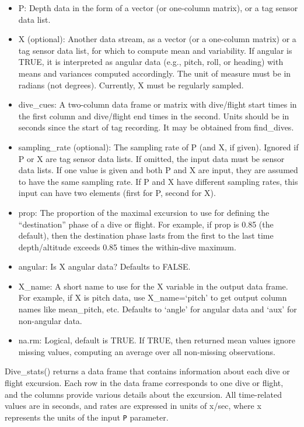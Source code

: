 \begin{itemize}
\tightlist
\item
  P: Depth data in the form of a vector (or one-column matrix), or a tag sensor data list.
\item
  X (optional): Another data stream, as a vector (or a one-column matrix) or a tag sensor data list, for which to compute mean and variability. If angular is TRUE, it is interpreted as angular data (e.g., pitch, roll, or heading) with means and variances computed accordingly. The unit of measure must be in radians (not degrees). Currently, X must be regularly sampled.
\item
  dive\_cues: A two-column data frame or matrix with dive/flight start times in the first column and dive/flight end times in the second. Units should be in seconds since the start of tag recording. It may be obtained from find\_dives.
\item
  sampling\_rate (optional): The sampling rate of P (and X, if given). Ignored if P or X are tag sensor data lists. If omitted, the input data must be sensor data lists. If one value is given and both P and X are input, they are assumed to have the same sampling rate. If P and X have different sampling rates, this input can have two elements (first for P, second for X).
\item
  prop: The proportion of the maximal excursion to use for defining the ``destination'' phase of a dive or flight. For example, if prop is 0.85 (the default), then the destination phase lasts from the first to the last time depth/altitude exceeds 0.85 times the within-dive maximum.
\item
  angular: Is X angular data? Defaults to FALSE.
\item
  X\_name: A short name to use for the X variable in the output data frame. For example, if X is pitch data, use X\_name=`pitch' to get output column names like mean\_pitch, etc. Defaults to `angle' for angular data and `aux' for non-angular data.
\item
  na.rm: Logical, default is TRUE. If TRUE, then returned mean values ignore missing values, computing an average over all non-missing observations.
\end{itemize}

Dive\_stats() returns a data frame that contains information about each dive or flight excursion. Each row in the data frame corresponds to one dive or flight, and the columns provide various details about the excursion. All time-related values are in seconds, and rates are expressed in units of x/sec, where x represents the units of the input \texttt{P} parameter.

